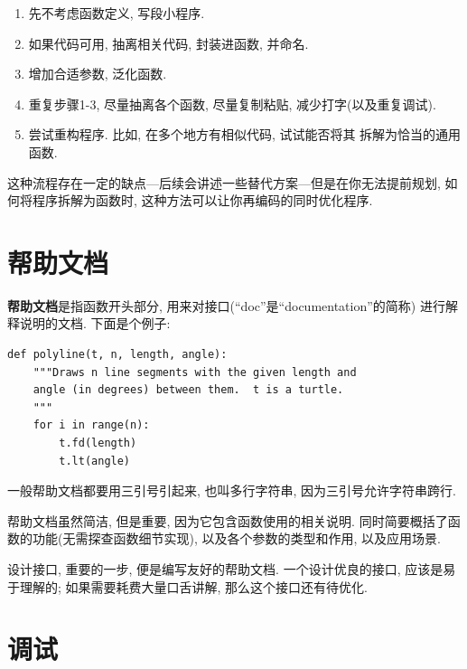 \documentclass[10pt]{book}
\begin{document}
\begin{enumerate}

\item 先不考虑函数定义, 写段小程序.

\item 如果代码可用, 抽离相关代码, 封装进函数, 并命名.

\item 增加合适参数, 泛化函数.

\item 重复步骤1-3, 尽量抽离各个函数, 尽量复制粘贴, 减少打字(以及重复调试).

\item 尝试重构程序. 比如, 在多个地方有相似代码, 试试能否将其
拆解为恰当的通用函数.

\end{enumerate}

这种流程存在一定的缺点---后续会讲述一些替代方案---但是在你无法提前规划, 
如何将程序拆解为函数时, 这种方法可以让你再编码的同时优化程序. 

\section{帮助文档}
\label{docstring}
{\bf 帮助文档}是指函数开头部分, 用来对接口(``doc''是``documentation''的简称)
进行解释说明的文档. 下面是个例子:

\begin{verbatim}
def polyline(t, n, length, angle):
    """Draws n line segments with the given length and
    angle (in degrees) between them.  t is a turtle.
    """    
    for i in range(n):
        t.fd(length)
        t.lt(angle)
\end{verbatim}
%
一般帮助文档都要用三引号引起来, 也叫多行字符串, 
因为三引号允许字符串跨行. 

帮助文档虽然简洁, 但是重要, 因为它包含函数使用的相关说明. 
同时简要概括了函数的功能(无需探查函数细节实现), 
以及各个参数的类型和作用, 以及应用场景. 

设计接口, 重要的一步, 便是编写友好的帮助文档. 
一个设计优良的接口, 应该是易于理解的;
如果需要耗费大量口舌讲解, 那么这个接口还有待优化. 


\section{调试}
\end{document}
